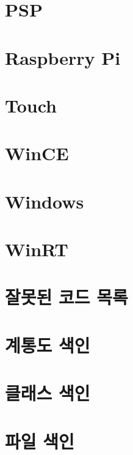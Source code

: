 \let\mypdfximage\pdfximage\def\pdfximage{\immediate\mypdfximage}\documentclass[twoside]{book}
\newcommand{\+}{\discretionary{\mbox{\scriptsize$\hookleftarrow$}}{}{}}
\begin{document}
\chapter{P\+SP}
\label{md__s_d_l_docs__r_e_a_d_m_e-psp}

\chapter{Raspberry Pi}
\label{md__s_d_l_docs__r_e_a_d_m_e-raspberrypi}

\chapter{Touch}
\label{md__s_d_l_docs__r_e_a_d_m_e-touch}

\chapter{Win\+CE}
\label{md__s_d_l_docs__r_e_a_d_m_e-wince}

\chapter{Windows}
\label{md__s_d_l_docs__r_e_a_d_m_e-windows}

\chapter{Win\+RT}
\label{md__s_d_l_docs__r_e_a_d_m_e-winrt}

\chapter{잘못된 코드 목록}
\label{deprecated}

\chapter{계통도 색인}

\chapter{클래스 색인}

\chapter{파일 색인}

\end{document}
